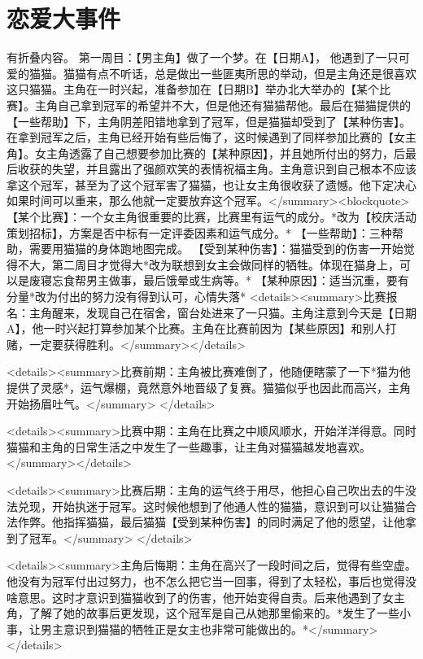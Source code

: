 \section{恋爱大事件}
有折叠内容。
第一周目：【男主角】做了一个梦。在【日期A】， 他遇到了一只可爱的猫猫。猫猫有点不听话，总是做出一些匪夷所思的举动，但是主角还是很喜欢这只猫猫。主角在一时兴起，准备参加在【日期B】举办北大举办的【某个比赛】。主角自己拿到冠军的希望并不大，但是他还有猫猫帮他。最后在猫猫提供的【一些帮助】下，主角阴差阳错地拿到了冠军，但是猫猫却受到了【某种伤害】。在拿到冠军之后，主角已经开始有些后悔了，这时候遇到了同样参加比赛的【女主角】。女主角透露了自己想要参加比赛的【某种原因】，并且她所付出的努力，后最后收获的失望，并且露出了强颜欢笑的表情祝福主角。主角意识到自己根本不应该拿这个冠军，甚至为了这个冠军害了猫猫，也让女主角很收获了遗憾。他下定决心如果时间可以重来，那么他就一定要放弃这个冠军。</summary><blockquote>
【某个比赛】：一个女主角很重要的比赛，比赛里有运气的成分。*改为【校庆活动策划招标】，方案是否中标有一定评委因素和运气成分。*
【一些帮助】：三种帮助，需要用猫猫的身体跑地图完成。
【受到某种伤害】：猫猫受到的伤害一开始觉得不大，第二周目才觉得大*改为联想到女主会做同样的牺牲。体现在猫身上，可以是废寝忘食帮男主做事，最后饿晕或生病等。*
【某种原因】：适当沉重，要有分量*改为付出的努力没有得到认可，心情失落*
<details><summary>比赛报名：主角醒来，发现自己在宿舍，窗台处进来了一只猫。主角注意到今天是【日期A】，他一时兴起打算参加某个比赛。主角在比赛前因为【某些原因】和别人打赌，一定要获得胜利。</summary></details>

<details><summary>比赛前期：主角被比赛难倒了，他随便瞎蒙了一下*猫为他提供了灵感*，运气爆棚，竟然意外地晋级了复赛。猫猫似乎也因此而高兴，主角开始扬眉吐气。</summary>
</details>

<details><summary>比赛中期：主角在比赛之中顺风顺水，开始洋洋得意。同时猫猫和主角的日常生活之中发生了一些趣事，让主角对猫猫越发地喜欢。</summary></details>

<details><summary>比赛后期：主角的运气终于用尽，他担心自己吹出去的牛没法兑现，开始执迷于冠军。这时候他想到了他通人性的猫猫，意识到可以让猫猫合法作弊。他指挥猫猫，最后猫猫【受到某种伤害】的同时满足了他的愿望，让他拿到了冠军。</summary>
</details>

<details><summary>主角后悔期：主角在高兴了一段时间之后，觉得有些空虚。他没有为冠军付出过努力，也不怎么把它当一回事，得到了太轻松，事后也觉得没啥意思。这时才意识到猫猫收到了的伤害，他开始变得自责。后来他遇到了女主角，了解了她的故事后更发现，这个冠军是自己从她那里偷来的。*发生了一些小事，让男主意识到猫猫的牺牲正是女主也非常可能做出的。*</summary></details>

